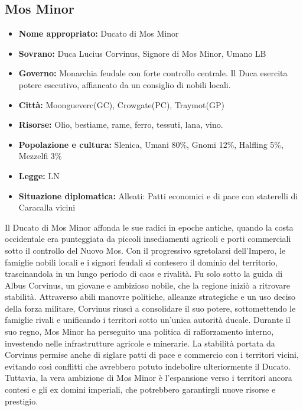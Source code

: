 \documentclass[10pt, a4paper]{report}
\begin{document}
\begin{multicols}{2}
\subsection*{Mos Minor}
\begin{itemize}
	\item \textbf{Nome appropriato:} Ducato di Mos Minor
	\item \textbf{Sovrano:} Duca Lucius Corvinus, Signore di Mos Minor, Umano LB
	\item \textbf{Governo:} Monarchia feudale con forte controllo centrale. Il Duca esercita potere esecutivo, affiancato da un consiglio di nobili locali.
	\item \textbf{Città:} Moongueverc(GC), Crowgate(PC), Traymot(GP)
	\item \textbf{Risorse:} Olio, bestiame, rame, ferro, tessuti, lana, vino.  
	\item \textbf{Popolazione e cultura:} Slenica, Umani 80\%, Gnomi 12\%, Halfling 5\%, Mezzelfi 3\%
	\item \textbf{Legge:} LN
	\item \textbf{Situazione diplomatica:} Alleati: Patti economici e di pace con staterelli di Caracalla vicini
\end{itemize}
Il Ducato di Mos Minor affonda le sue radici in epoche antiche, quando la costa occidentale era punteggiata da piccoli insediamenti agricoli e porti commerciali sotto il controllo del Nuovo Mos. Con il progressivo sgretolarsi dell’Impero, le famiglie nobili locali e i signori feudali si contesero il dominio del territorio, trascinandola in un lungo periodo di caos e rivalità.
Fu solo sotto la guida di Albus Corvinus, un giovane e ambizioso nobile, che la regione iniziò a ritrovare stabilità. Attraverso abili manovre politiche, alleanze strategiche e un uso deciso della forza militare, Corvinus riuscì a consolidare il suo potere, sottomettendo le famiglie rivali e unificando i territori sotto un’unica autorità ducale.
Durante il suo regno, Mos Minor ha perseguito una politica di rafforzamento interno, investendo nelle infrastrutture agricole e minerarie. La stabilità portata da Corvinus permise anche di siglare patti di pace e commercio con i territori vicini, evitando così conflitti che avrebbero potuto indebolire ulteriormente il Ducato. Tuttavia, la vera ambizione di Mos Minor è l’espansione verso i territori ancora contesi e gli ex domini imperiali, che potrebbero garantirgli nuove risorse e prestigio.


\end{multicols}
\end{document}
